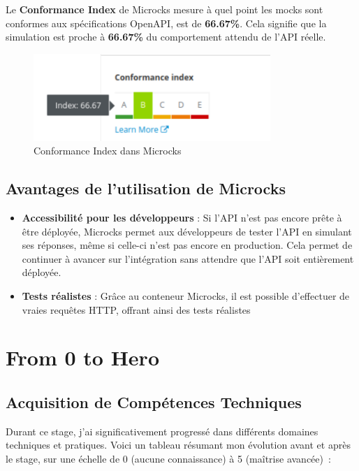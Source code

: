 \documentclass{article}
\begin{document}
	Le \textbf{Conformance Index} de Microcks mesure à quel point les mocks sont conformes aux spécifications OpenAPI, est de \textbf{66.67\%}. Cela signifie que la simulation est proche à \textbf{66.67\%} du comportement attendu de l'API réelle.
	
	\begin{figure}[H]
		\centering
		\includegraphics[width=0.8\textwidth]{asset/conformance-index.png}
		\caption{Conformance Index dans Microcks}
		\label{fig:conformance-index}
	\end{figure}
	
	\subsection*{Avantages de l'utilisation de Microcks}
	
	\begin{itemize}
		\item \textbf{Accessibilité pour les développeurs} : Si l'API n'est pas encore prête à être déployée, Microcks permet aux développeurs de tester l'API en simulant ses réponses, même si celle-ci n'est pas encore en production. Cela permet de continuer à avancer sur l'intégration sans attendre que l'API soit entièrement déployée.
		\item \textbf{Tests réalistes} : Grâce au conteneur Microcks, il est possible d'effectuer de vraies requêtes HTTP, offrant ainsi des tests réalistes
	\end{itemize}
	
	\section{From 0 to Hero}
	
	\subsection{Acquisition de Compétences Techniques}
	
	Durant ce stage, j'ai significativement progressé dans différents domaines techniques et pratiques. Voici un tableau résumant mon évolution avant et après le stage, sur une échelle de 0 (aucune connaissance) à 5 (maîtrise avancée) :
	
\end{document}
